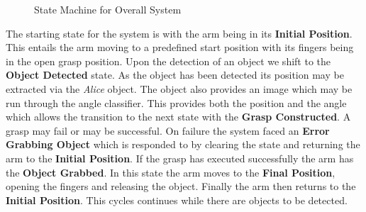 \documentclass[letterpaper, 10 pt, conference]{conf/ieeeconf}  %
\begin{document}
\begin{figure}[h]
  \centering
  \caption{\label{fig:1}State Machine for Overall System}
\end{figure}
The starting state for the system is with the arm being in its \textbf{Initial
  Position}. This entails the arm moving to a predefined start position with its
fingers being in the open grasp position. Upon the detection of an object we
shift to the \textbf{Object Detected} state. As the object has been detected its
position may be extracted via the \textit{Alice} object. The object also
provides an image which may be run through the angle classifier. This provides
both the position and the angle which allows the transition to the next state
with the \textbf{Grasp Constructed}. A grasp may fail or may be successful. On
failure the system faced an \textbf{Error Grabbing Object} which is responded to
by clearing the state and returning the arm to the \textbf{Initial Position}. If
the grasp has executed successfully the arm has the \textbf{Object Grabbed}. In
this state the arm moves to the \textbf{Final Position}, opening the fingers and
releasing the object. Finally the arm then returns to the \textbf{Initial
  Position}. This cycles continues while there are objects to be detected.
\end{document}
